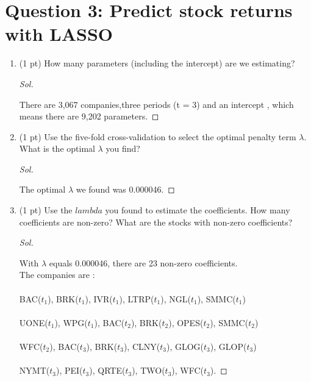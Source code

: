 \documentclass[11pt, oneside]{article}   	%
\newenvironment{Solution}[1][Sol]{%
  \begin{proof}[#1]$ $\par\nobreak\ignorespaces
	\qquad
}{%
  \end{proof}
}
\begin{document}
\section*{Question 3: Predict stock returns with LASSO}
\begin{enumerate}[resume*]
	\item (1 pt) How many parameters (including the intercept) are we estimating?
	      \begin{Solution}
            There are 3,067 companies,three periods (t = 3) and an intercept , which means there are 9,202 parameters.  
	      \end{Solution}
	\item (1 pt) Use the five-fold cross-validation to select the optimal penalty
	      term $\lambda$. What is the optimal $\lambda$ you find?
	      \begin{Solution}
                The optimal $\lambda$ we found was 0.000046.
	      \end{Solution}
	\item (1 pt) Use the $lambda$ you found to estimate the coefficients.
	      How many coefficients are non-zero? What are the stocks with
	      non-zero coefficients?
	      \begin{Solution}
            With $\lambda$ equals 0.000046, there are 23 non-zero 
            coefficients.\\
                The companies are : \\ \\
                BAC($t_1$), BRK($t_1$), IVR($t_1$), LTRP($t_1$), NGL($t_1$), SMMC($t_1$)\\ \\
                UONE($t_1$), WPG($t_1$), BAC($t_2$), BRK($t_2$), OPES($t_2$), SMMC($t_2$)\\ \\
                WFC($t_2$), BAC($t_3$), BRK($t_3$), CLNY($t_3$), GLOG($t_3$), GLOP($t_3$)\\ \\ NYMT($t_3$),
                PEI($t_3$), QRTE($t_3$), TWO($t_3$), WFC($t_3$).
            
	      \end{Solution}
\end{enumerate}
\end{document}
